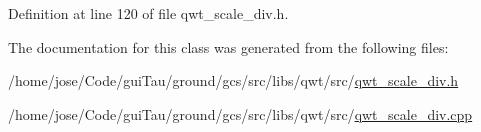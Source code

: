 Definition at line 120 of file qwt\-\_\-scale\-\_\-div.\-h.



The documentation for this class was generated from the following files\-:\begin{DoxyCompactItemize}
\item 
/home/jose/\-Code/gui\-Tau/ground/gcs/src/libs/qwt/src/\hyperlink{qwt__scale__div_8h}{qwt\-\_\-scale\-\_\-div.\-h}\item 
/home/jose/\-Code/gui\-Tau/ground/gcs/src/libs/qwt/src/\hyperlink{qwt__scale__div_8cpp}{qwt\-\_\-scale\-\_\-div.\-cpp}\end{DoxyCompactItemize}
